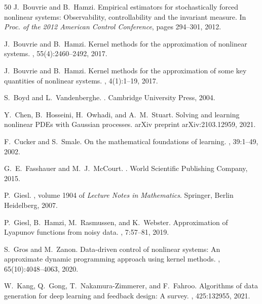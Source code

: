 \documentclass[11pt]{article}
\begin{document}
\begin{thebibliography}{50}
J.~Bouvrie and B.~Hamzi.
\newblock Empirical estimators for stochastically forced nonlinear systems: Observability, controllability and the invariant measure.
\newblock In {\em Proc. of the 2012 American Control Conference}, pages 294--301, 2012.

J.~Bouvrie and B.~Hamzi.
\newblock Kernel methods for the approximation of nonlinear systems.
, 55(4):2460--2492, 2017.

J.~Bouvrie and B.~Hamzi.
\newblock Kernel methods for the approximation of some key quantities of nonlinear systems.
, 4(1):1--19, 2017.

S.~Boyd and L.~Vandenberghe.
.
\newblock Cambridge University Press, 2004.

Y.~Chen, B.~Hosseini, H.~Owhadi, and A.~M.~Stuart.
\newblock Solving and learning nonlinear PDEs with {G}aussian processes.
\newblock arXiv preprint arXiv:2103.12959, 2021.

F.~Cucker and S.~Smale.
\newblock On the mathematical foundations of learning.
, 39:1--49, 2002.

G.~E.~Fasshauer and M.~J.~McCourt.
.
\newblock World Scientific Publishing Company, 2015.

P.~Giesl.
, volume 1904 of {\em Lecture Notes in Mathematics}.
\newblock Springer, Berlin Heidelberg, 2007.

P.~Giesl, B.~Hamzi, M.~Rasmussen, and K.~Webster.
\newblock Approximation of {L}yapunov functions from noisy data.
, 7:57--81, 2019.

S.~Gros and M.~Zanon.
\newblock Data-driven control of nonlinear systems: An approximate dynamic programming approach using kernel methods.
, 65(10):4048--4063, 2020.

W.~Kang, Q.~Gong, T.~Nakamura-Zimmerer, and F.~Fahroo.
\newblock Algorithms of data generation for deep learning and feedback design: A survey.
, 425:132955, 2021.


\end{thebibliography}
\end{document}
